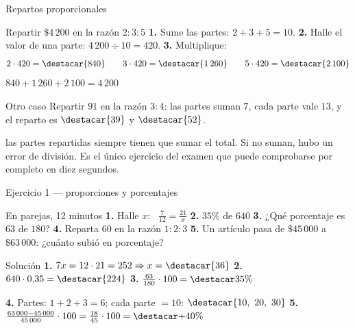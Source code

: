 \documentclass[aspectratio=169,10pt]{beamer}
\begin{document}
\begin{frame}{Repartos proporcionales}
  \scriptsize
  \begin{exampleblock}{Repartir $\$4\,200$ en la razón $2:3:5$}
    \tiny
    \textbf{1.} Sume las partes: $2+3+5 = 10$. \quad
    \textbf{2.} Halle el valor de una parte: $4\,200\div 10 = 420$. \quad
    \textbf{3.} Multiplique:
    \[ 2\cdot 420 = \destacar{840} \qquad
       3\cdot 420 = \destacar{1\,260} \qquad
       5\cdot 420 = \destacar{2\,100} \]
     $840+1\,260+2\,100 = 4\,200$ \checkmark
  \end{exampleblock}

  \vspace{0.1cm}
  \begin{block}{Otro caso}
    \tiny
    Repartir $91$ en la razón $3:4$: las partes suman $7$, cada parte vale
    $13$, y el reparto es $\destacar{39}$ y $\destacar{52}$.
  \end{block}

  \vspace{0.08cm}
  {\tiny\color{uniGris} 
  las partes repartidas siempre tienen que sumar el total. Si no suman, hubo
  un error de división. Es el único ejercicio del examen que puede
  comprobarse por completo en diez segundos.}
\end{frame}

\begin{frame}{Ejercicio 1 — proporciones y porcentajes}
  \scriptsize
  \begin{alertblock}{En parejas, 12 minutos}
    \tiny
    \textbf{1.} Halle $x$: \ $\tfrac{7}{12}=\tfrac{21}{x}$ \qquad
    \textbf{2.} $35\%$ de $640$ \qquad
    \textbf{3.} ¿Qué porcentaje es $63$ de $180$? \qquad
    \textbf{4.} Reparta $60$ en la razón $1:2:3$ \qquad
    \textbf{5.} Un artículo pasa de $\$45\,000$ a $\$63\,000$: ¿cuánto subió
    en porcentaje?
  \end{alertblock}

  \vspace{0.05cm}
  \begin{block}{Solución}
    \tiny
    \textbf{1.} $7x = 12\cdot 21 = 252 \Rightarrow x=\destacar{36}$ \qquad
    \textbf{2.} $640\cdot 0{,}35 = \destacar{224}$ \qquad
    \textbf{3.} $\tfrac{63}{180}\cdot 100 = \destacar{35\%}$

    \vspace{0.08cm}
    \textbf{4.} Partes: $1+2+3=6$; cada parte $=10$:
    $\destacar{10,\ 20,\ 30}$ \qquad
    \textbf{5.} $\tfrac{63\,000-45\,000}{45\,000}\cdot 100
    = \tfrac{18}{45}\cdot 100 = \destacar{+40\%}$
  \end{block}
\end{frame}
\end{document}
